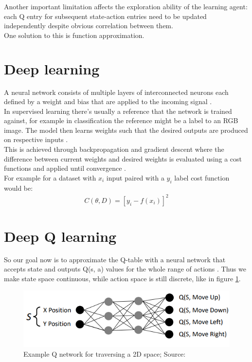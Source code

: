 Another important limitation affects the exploration ability of the learning agent: each Q entry for subsequent state-action entries need to be updated independently despite obvious correlation between them.\\

One solution to this is function approximation.

\section{Deep learning}

A neural network consists of multiple layers of interconnected neurons each defined by a weight and bias that are applied to the incoming signal \cite{lecture_intro_to_deep_rl}.\\

In supervised learning there's usually a reference that 
the network is trained against, for example in classification the reference might be a label to an RGB image. The model then learns weights such that the desired outputs are produced on respective inputs \cite{lecture_intro_to_deep_rl} . \\

This is achieved through backpropagation and gradient descent where the difference between current weights and desired weights is evaluated using a cost functions and applied until convergence \cite{lecture_intro_to_deep_rl} .\\

For example for a dataset with $x_i$ input paired with a $y_i$ label cost function would be: 
\begin{align}
    C(\theta, D) = [y_i - f(x_i)]^2
\end{align}

\section{Deep Q learning}

So our goal now is to approximate the Q-table with a neural network that accepts state and outputs Q(s, a) 
values for the whole range of actions \cite{lecture_intro_to_deep_rl}. Thus we make state space continuous, while action space is still discrete, like in figure \ref{fig:q_network  }.

\begin{figure}[H]
  \centering
  \includegraphics[scale=0.5]{figures/q_network.PNG}
  \caption{Example Q network for traversing a 2D space; Source: \cite{lecture_intro_to_deep_rl}}
  \label{fig:q_network  }
\end{figure}

